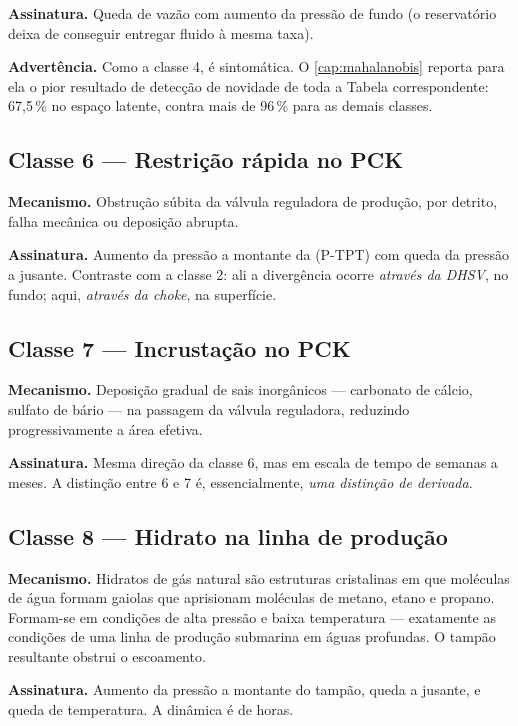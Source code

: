 \textbf{Assinatura.} Queda de vazão com aumento da pressão de fundo (o reservatório
deixa de conseguir entregar fluido à mesma taxa).

\textbf{Advertência.} Como a classe 4, é sintomática. O \cref{cap:mahalanobis} reporta
para ela o pior resultado de detecção de novidade de toda a Tabela correspondente:
67,5\,\% no espaço latente, contra mais de 96\,\% para as demais classes.

\subsection{Classe 6 --- Restrição rápida no PCK}

\textbf{Mecanismo.} Obstrução súbita da válvula reguladora de produção, por detrito,
falha mecânica ou deposição abrupta.

\textbf{Assinatura.} Aumento da pressão a montante da  (P-TPT) com queda da
pressão a jusante. Contraste com a classe 2: ali a divergência ocorre \emph{através da
DHSV}, no fundo; aqui, \emph{através da choke}, na superfície.

\subsection{Classe 7 --- Incrustação no PCK}

\textbf{Mecanismo.} Deposição gradual de sais inorgânicos --- carbonato de cálcio,
sulfato de bário --- na passagem da válvula reguladora, reduzindo progressivamente a
área efetiva.

\textbf{Assinatura.} Mesma direção da classe 6, mas em escala de tempo de semanas a
meses. A distinção entre 6 e 7 é, essencialmente, \emph{uma distinção de derivada}.

\subsection{Classe 8 --- Hidrato na linha de produção}

\textbf{Mecanismo.} Hidratos de gás natural são estruturas cristalinas em que moléculas
de água formam gaiolas que aprisionam moléculas de metano, etano e propano. Formam-se
em condições de alta pressão e baixa temperatura --- exatamente as condições de uma
linha de produção submarina em águas profundas. O tampão resultante obstrui o
escoamento.

\textbf{Assinatura.} Aumento da pressão a montante do tampão, queda a jusante, e queda
de temperatura. A dinâmica é de horas.

